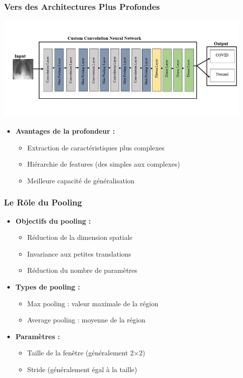 \documentclass{beamer}
\begin{document}
\begin{frame}
    \frametitle{Vers des Architectures Plus Profondes}
    \begin{center}
        \includegraphics[width=0.95\textwidth]{images/CNN_example.png}
    \end{center}
    \begin{itemize}
        \item \textbf{Avantages de la profondeur :}
        \begin{itemize}
            \item Extraction de caractéristiques plus complexes
            \item Hiérarchie de features (des simples aux complexes)
            \item Meilleure capacité de généralisation
        \end{itemize}
    \end{itemize}
\end{frame}

\begin{frame}
    \frametitle{Le Rôle du Pooling}
    \begin{itemize}
        \item \textbf{Objectifs du pooling :}
        \begin{itemize}
            \item Réduction de la dimension spatiale
            \item Invariance aux petites translations
            \item Réduction du nombre de paramètres
        \end{itemize}
        \item \textbf{Types de pooling :}
        \begin{itemize}
            \item Max pooling : valeur maximale de la région
            \item Average pooling : moyenne de la région
        \end{itemize}
        \item \textbf{Paramètres :}
        \begin{itemize}
            \item Taille de la fenêtre (généralement 2×2)
            \item Stride (généralement égal à la taille)
        \end{itemize}
    \end{itemize}
\end{frame}
\end{document}
